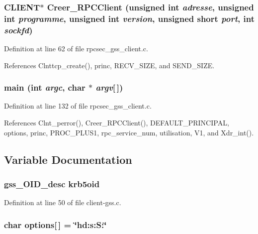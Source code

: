 \subsubsection{\setlength{\rightskip}{0pt plus 5cm}CLIENT$\ast$ Creer\_\-RPCClient (unsigned int {\em adresse}, unsigned int {\em programme}, unsigned int {\em version}, unsigned short {\em port}, int {\em sockfd})}\label{rpcsec__gss__client_8c_a15}




Definition at line 62 of file rpcsec\_\-gss\_\-client.c.

References Clnttcp\_\-create(), princ, RECV\_\-SIZE, and SEND\_\-SIZE.
\subsubsection{\setlength{\rightskip}{0pt plus 5cm}main (int {\em argc}, char $\ast$ {\em argv}[$\,$])}\label{rpcsec__gss__client_8c_a16}




Definition at line 132 of file rpcsec\_\-gss\_\-client.c.

References Clnt\_\-perror(), Creer\_\-RPCClient(), DEFAULT\_\-PRINCIPAL, options, princ, PROC\_\-PLUS1, rpc\_\-service\_\-num, utilisation, V1, and Xdr\_\-int().

\subsection{Variable Documentation}
\subsubsection{\setlength{\rightskip}{0pt plus 5cm}gss\_\-OID\_\-desc {\bf krb5oid}}\label{rpcsec__gss__client_8c_a10}




Definition at line 50 of file client-gss.c.
\subsubsection{\setlength{\rightskip}{0pt plus 5cm}char {\bf options}[$\,$] = \char`\"{}hd:s:S:\char`\"{}}\label{rpcsec__gss__client_8c_a11}




